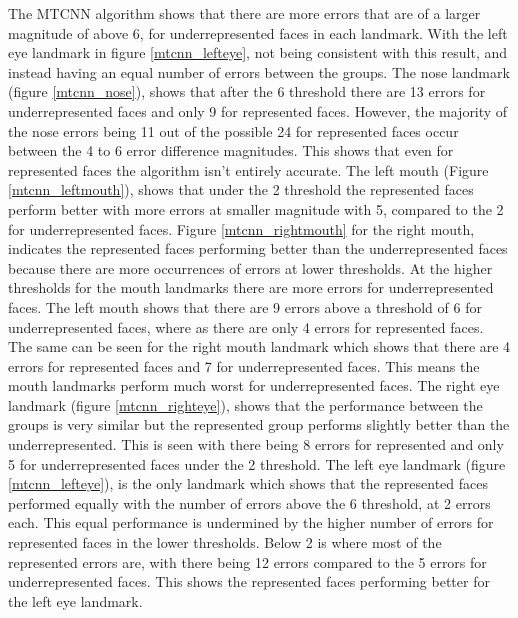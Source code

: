\documentclass{l4proj}
\begin{document}
The MTCNN algorithm shows that there are more errors that are of a larger magnitude of above 6, for underrepresented faces in each landmark. With the left eye landmark in figure \ref{mtcnn_lefteye}, not being consistent with this result, and instead having an equal number of errors between the groups. The nose landmark (figure \ref{mtcnn_nose}), shows that after the 6 threshold there are 13 errors for underrepresented faces and only 9 for represented faces. However, the majority of the nose errors being 11 out of the possible 24 for represented faces occur between the 4 to 6 error difference magnitudes. This shows that even for represented faces the algorithm isn't entirely accurate. The left mouth (Figure \ref{mtcnn_leftmouth}), shows that under the 2 threshold the represented faces perform better with more errors at smaller magnitude with 5, compared to the 2 for underrepresented faces. Figure \ref{mtcnn_rightmouth} for the right mouth, indicates the represented faces performing better than the underrepresented faces because there are more occurrences of errors at lower thresholds. At the higher thresholds for the mouth landmarks there are more errors for underrepresented faces. The left mouth shows that there are 9 errors above a threshold of 6 for underrepresented faces, where as there are only 4 errors for represented faces. The same can be seen for the right mouth landmark which shows that there are 4 errors for represented faces and 7 for underrepresented faces. This means the mouth landmarks perform much worst for underrepresented faces. The right eye landmark (figure \ref{mtcnn_righteye}), shows that the performance between the groups is very similar but the represented group performs slightly better than the underrepresented. This is seen with there being 8 errors for represented and only 5 for underrepresented faces under the 2 threshold. The left eye landmark (figure \ref{mtcnn_lefteye}), is the only landmark which shows that the represented faces performed equally with the number of errors above the 6 threshold, at 2 errors each. This equal performance is undermined by the higher number of errors for represented faces in the lower thresholds. Below 2 is where most of the represented errors are, with there being 12 errors compared to the 5 errors for underrepresented faces. This shows the represented faces performing better for the left eye landmark. 
\end{document}

